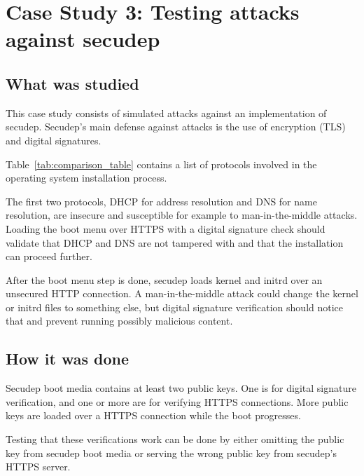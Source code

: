 \section{Case Study 3: Testing attacks against secudep}
\label{sec:casestudy3}

\subsection{What was studied}

This case study consists of simulated attacks against an
implementation of secudep. Secudep's main defense against attacks is
the use of encryption (TLS) and digital signatures.

Table~\ref{tab:comparison_table} contains a list of protocols involved
in the operating system installation process.

The first two protocols, DHCP for address resolution and DNS for name
resolution, are insecure and susceptible for example to
man-in-the-middle attacks. Loading the boot menu over HTTPS with a
digital signature check should validate that DHCP and DNS are not
tampered with and that the installation can proceed further.

After the boot menu step is done, secudep loads kernel and initrd over
an unsecured HTTP connection. A man-in-the-middle attack could change
the kernel or initrd files to something else, but digital signature
verification should notice that and prevent running possibly malicious
content.


\subsection{How it was done}

Secudep boot media contains at least two public keys. One is for
digital signature verification, and one or more are for verifying
HTTPS connections. More public keys are loaded over a HTTPS connection
while the boot progresses.

Testing that these verifications work can be done by either omitting
the public key from secudep boot media or serving the wrong public key
from secudep's HTTPS server.


